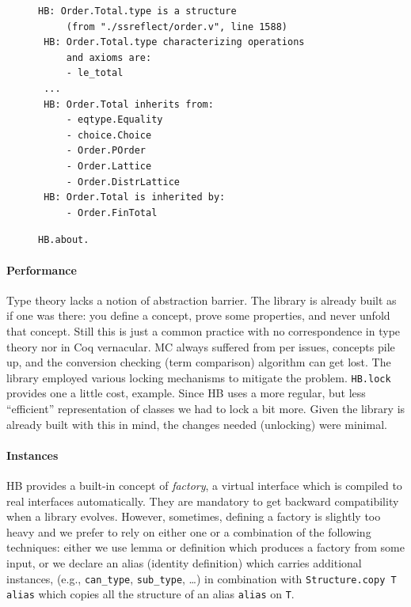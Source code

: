 \documentclass{easychair}
\def\MC{{\sf MC}}
\def\HB{{\sf HB}}
\def\newterm#1{{\it #1}}
\begin{document}
\begin{figure}
\vspace{-1em}
\begin{Verbatim}[fontsize=\footnotesize]
 HB: Order.Total.type is a structure
     (from "./ssreflect/order.v", line 1588)
 HB: Order.Total.type characterizing operations
     and axioms are:
     - le_total
 ...
 HB: Order.Total inherits from:
     - eqtype.Equality
     - choice.Choice
     - Order.POrder
     - Order.Lattice
     - Order.DistrLattice
 HB: Order.Total is inherited by:
     - Order.FinTotal
\end{Verbatim}
\vspace{-1.5em}
\caption{\small {\tt HB.about.}}
\label{fig:orderabout}
\end{figure}

\paragraph{Performance}

Type theory lacks a notion of abstraction barrier. The library is already built
as if one was there: you define a concept, prove some properties, and never
unfold that concept. Still this is just a common practice with no correspondence
in type theory nor in Coq vernacular. \MC{} always suffered from per issues, concepts pile up,
and the conversion checking (term comparison) algorithm can get lost. The
library employed various locking mechanisms to mitigate the problem. \verb+HB.lock+
provides one a little cost, example.
Since \HB{} uses a more regular, but less ``efficient'' representation of classes
we had to lock a bit more. Given the library is already built with this in mind,
the changes needed (unlocking) were minimal.

\paragraph{Instances}

\HB{} provides a built-in concept of \newterm{factory}, a virtual interface which is
compiled to real interfaces automatically. They are mandatory to get backward
compatibility when a library evolves. However, sometimes, defining a factory is
slightly too heavy and we prefer to rely on either one or a combination of the
following techniques: either we use lemma or definition which produces a
factory from some input, or we declare an alias (identity definition) which
carries additional instances, (e.g., \verb+can_type+, \verb+sub_type+, \ldots) in
combination with \verb+Structure.copy T alias+ which copies all the structure
of an alias \verb+alias+ on \verb+T+.
\end{document}

